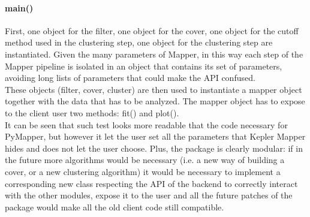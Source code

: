 \paragraph{main()}
First, one object for the filter, one object for the cover, one object for the cutoff method used in the clustering step, one object for the clustering step are instantiated. Given the many parameters of Mapper, in this way each step of the Mapper pipeline is isolated in an object that contains its set of parameters, avoiding long lists of parameters that could make the API confused.\\
These objects (filter, cover, cluster) are then used to instantiate a mapper object together with the data that has to be analyzed. The mapper object has to expose to the client user two methods: fit() and plot().\\
It can be seen that such test looks more readable that the code necessary for PyMapper, but however it let the user set all the parameters that Kepler Mapper hides and does not let the user choose. Plus, the package is clearly modular: if in the future more algorithms would be necessary (i.e. a new way of building a cover, or a new clustering algorithm) it would be necessary to implement a corresponding new class respecting the API of the backend to correctly interact with the other modules, expose it to the user and all the future patches of the package would make all the old client code still compatible.\\

